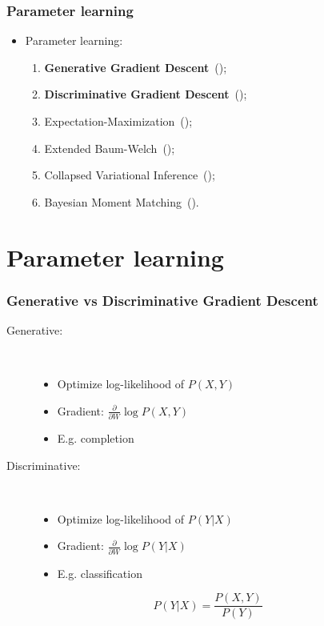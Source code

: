 \documentclass{beamer}
\newcommand{\ddspn}[2]{\frac{\partial#1}{\partial#2}}
\begin{document}
\begin{frame}
  \frametitle{Parameter learning}

  \begin{itemize}
    \item Parameter learning:
      \begin{enumerate}
        \item \textbf{Generative Gradient Descent}~(\cite{poon-domingos,diff-approach-darwiche});
        \item \textbf{Discriminative Gradient Descent}~(\cite{discriminative});
        \item Expectation-Maximization~(\cite{poon-domingos});
        \item Extended Baum-Welch~(\cite{baum-welch});
        \item Collapsed Variational Inference~(\cite{variational-spn});
        \item Bayesian Moment Matching~(\cite{bayesian-moment}).
      \end{enumerate}
  \end{itemize}
\end{frame}

\section{Parameter learning}

\begin{frame}
  \frametitle{Generative vs Discriminative Gradient Descent}

  \begin{description}
    \item[Generative:]~\\
      \begin{itemize}
        \item Optimize log-likelihood of $P(X,Y)$
        \item Gradient: $\ddspn{}{W}\log P(X,Y)$
        \item E.g. completion
      \end{itemize}
    \item[Discriminative:]~\\
      \begin{itemize}
        \item Optimize log-likelihood of $P(Y|X)$
        \item Gradient: $\ddspn{}{W}\log P(Y|X)$
        \item E.g. classification
      \end{itemize}
  \end{description}


  \begin{equation*}
    P(Y|X)=\frac{P(X,Y)}{P(Y)}
  \end{equation*}
\end{frame}
\end{document}
